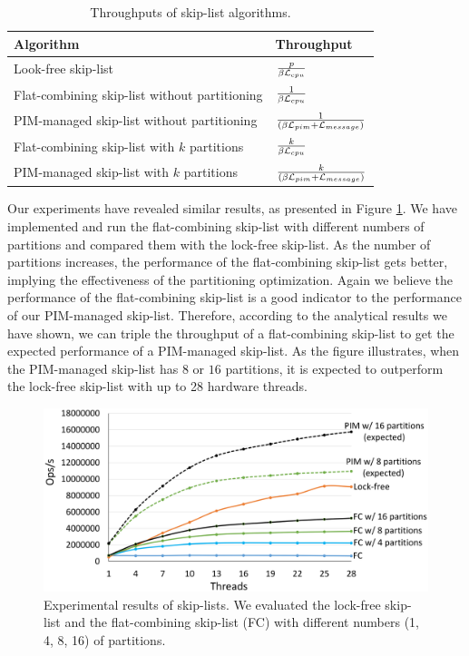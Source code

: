 \begin{table}[ht!]
\begin{center}
    \begin{tabular}{| l | l |}
    \hline
    Algorithm & Throughput\\ \hline
    Look-free skip-list & ${p \over \beta\mathcal{L}_{cpu}}$ \\ \hline
    Flat-combining skip-list without partitioning & ${1 \over \beta\mathcal{L}_{cpu}}$ \\ \hline
    PIM-managed skip-list without partitioning & ${1 \over (\beta\mathcal{L}_{pim} + \mathcal{L}_{message})}$ \\ \hline
    Flat-combining skip-list with $k$ partitions & ${k \over \beta\mathcal{L}_{cpu}}$ \\ \hline
    PIM-managed skip-list with $k$ partitions & ${k \over (\beta\mathcal{L}_{pim} + \mathcal{L}_{message})}$ \\ \hline
    \end{tabular}
\end{center}
\caption{Throughputs of skip-list algorithms.}
\label{tab:skiplist}
\end{table}

Our experiments have revealed similar results, 
as presented in Figure \ref{figure:skiplist_data}.
We have implemented and run the flat-combining skip-list with different numbers of
partitions and compared them with the lock-free skip-list.
As the number of partitions increases, the performance of the flat-combining skip-list
gets better, implying the effectiveness of the partitioning optimization.
Again we believe the performance of the flat-combining skip-list is a good indicator
to the performance of our PIM-managed skip-list.
Therefore, according to the analytical results we have shown, we can triple the throughput
of a flat-combining skip-list to get the expected performance of a PIM-managed skip-list.
As the figure illustrates, when the PIM-managed skip-list has $8$ or $16$ partitions,
it is expected to outperform the lock-free skip-list with up to 28 hardware threads.

\begin{figure}[ht!]
    \centering
    \includegraphics[width=1.0\linewidth]{skiplist_data.eps} %
    \caption{Experimental results of skip-lists. We evaluated the lock-free skip-list and 
    the flat-combining skip-list (FC) with different numbers (1, 4, 8, 16) of partitions.}
    \label{figure:skiplist_data}
\end{figure}


